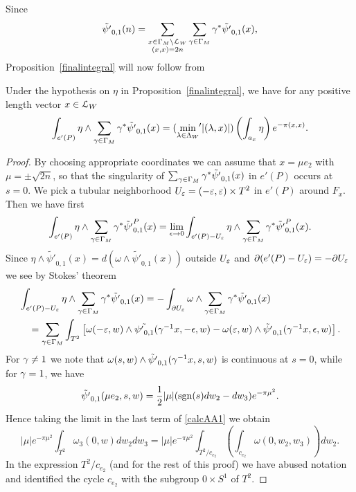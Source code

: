 Since 
\[
\tilde{\psi'}_{0,1}(n) = \sum_{ \substack{x\in \Gamma_M \backslash \mathcal{L}_W \\ (x,x)=2n}} \sum_{ \gamma \in \Gamma_M} \gamma^{\ast} \tilde{\psi'}_{0,1}(x),
\]
Proposition~\ref{finalintegral} will now follow from

\begin{proposition}
Under the hypothesis on $\eta$ in Proposition~\ref{finalintegral}, we have for any positive length vector $x \in \mathcal{L}_W$
\[
\int_{e'(P)} \eta \wedge  \sum_{ \gamma \in \Gamma_M} \gamma^{\ast} \tilde{\psi'}_{0,1}(x) = (\min_{\lambda \in \Lambda_W}   {\hspace{-2pt}'}|(\lambda,x)|) \left(\int_{a_x} \eta \right) e^{-\pi (x,x)}.
\]
\end{proposition}


\begin{proof}
By choosing appropriate coordinates we can assume that $x = \mu e_2$ with $\mu = \pm \sqrt{2n}$, so that the singularity of $\sum_{ \gamma \in \Gamma_M} \gamma^{\ast} \tilde{\psi'}_{0,1}(x)$ in $e'(P)$ occurs at $s=0$. 
We pick a tubular neighborhood $U_\varepsilon= (-\varepsilon,\varepsilon) \times T^2$ in $e'(P)$ around $F_x$. Then we have first
\[
\int_{e'(P)} \eta \wedge  \sum_{ \gamma \in \Gamma_M} \gamma^{\ast} \tilde{\psi'}_{0,1}^P(x)= 
  \lim_{\epsilon \to 0} \int_{e'(P) - U_{\varepsilon}} \eta \wedge   \sum_{ \gamma \in \Gamma_M} \gamma^{\ast}\tilde{\psi'}_{0,1}^P(x).
 \]
Since $\eta \wedge \tilde{\psi'}_{0,1}(x) = d(\omega \wedge \tilde{\psi'}_{0,1}(x))$ outside $U_{\varepsilon}$ and $\partial (e'(P) - U_{\varepsilon}) =
- \partial U_{\varepsilon}$   we see by Stokes' theorem
\begin{align}\label{calcAA1}
&\int_{e'(P) - U_{\varepsilon}} \eta \wedge  \sum_{ \gamma \in \Gamma_M} \gamma^{\ast} \tilde{\psi'}_{0,1}(x)
= - \int_{\partial U_{\varepsilon}} \omega \wedge   \sum_{ \gamma \in \Gamma_M} \gamma^{\ast}\tilde{\psi'}_{0,1}(x) \\
& \quad = \sum_{ \gamma \in \Gamma_M}  \int_{T^2} \left[\omega(-\varepsilon,w) \wedge \tilde{{\psi'}_{0,1}}(\gamma^{-1}x,-\epsilon,w) - 
\omega(\varepsilon,w) \wedge \tilde{\psi'}_{0,1}(\gamma^{-1} x,\epsilon,w) \right]. \notag
\end{align}
For $\gamma \ne 1$ we note that $\omega(s,w) \wedge \tilde{\psi'}_{0,1}(\gamma^{-1}x,s,w)$ is continuous at $s=0$, while for $\gamma=1$, we have
\begin{equation}\label{psi'formula}
 \tilde{\psi'}_{0,1}(\mu e_2,s,w) =  \frac12|\mu| (\operatorname{sgn}(s)dw_2-dw_3) e^{- \pi \mu^2}.
 \end{equation}
Hence taking the limit in the last term of  \eqref{calcAA1} we obtain 
\[
|\mu| e^{- \pi \mu^2}\int_{T^2} \omega_3(0,w) dw_2dw_3 = |\mu|  e^{- \pi \mu^2}\int_{T^2/ c_{e_2}} \left( \int_{c_{e_2}} \omega(0,w_2,w_3) \right) dw_2.
 \]In the expression $T^2/ c_{e_2}$ (and for the rest of this proof)  we have abused notation and identified the cycle $c_{e_2}$ with the subgroup $0 \times S^1$ of $T^2$.


\end{proof}
